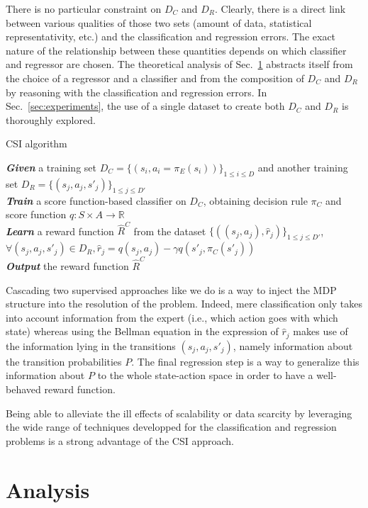 \documentclass{llncs}
\begin{document}
There is no particular constraint on $D_C$ and $D_R$. Clearly, there is a direct link between various qualities of those two sets (amount of data, statistical representativity, etc.) and the classification and regression errors. The exact nature of the relationship between these quantities depends on which classifier and regressor are chosen. The theoretical analysis of Sec.~\ref{sec:analysis} abstracts itself from the choice of a regressor and a classifier and from the composition of $D_C$ and $D_R$ by reasoning with the classification and regression errors. In Sec.~\ref{sec:experiments}, %
the use of a single dataset to create both $D_C$ and $D_R$ is thoroughly explored.
\begin{algorithm}%
  \caption{CSI algorithm}
  \label{algo:cascading}
  \emph{\textbf{Given}} a training set $D_C=\{(s_i,a_i=\pi_E(s_i))\}_{1\leq i \leq D}$ and another training set $D_R=\{(s_{j},a_{j},s'_{j})\}_{1\leq j \leq D'}$\;\\
  \emph{\textbf{Train}} a score function-based classifier on $D_C$, obtaining decision rule $\pi_C$ and score function $q:S\times A \rightarrow \mathbb R$\;\\
  \emph{\textbf{Learn}} a reward function $\hat R^C$ from the dataset $\{((s_{j},a_{j}),\hat{r}_j)\}_{1\leq j \leq D'}$, $\forall (s_j,a_j,s'_j) \in D_R,\hat{r}_j=q(s_{j},a_{j})-\gamma q(s'_{j},\pi_C(s'_{j}))$\;\\
  \emph{\textbf{Output}} the reward function $\hat R^{C}$ \;
\end{algorithm}

Cascading two supervised approaches like we do is a way to inject the MDP structure into the resolution of the problem. Indeed, mere classification only takes into account information from the expert (i.e., which action goes with which state) whereas using the Bellman equation in the expression of $\hat r_j$ makes use of the information lying in the transitions $(s_j,a_j,s'_j)$, namely information about the transition probabilities $P$. The final regression step is a way to generalize this information about $P$ to the whole state-action space in order to have a well-behaved reward function.

Being able to alleviate the ill effects of scalability or data scarcity by leveraging the wide range of techniques developped for the classification and regression problems is a strong advantage of the CSI approach.

\section{Analysis}
\label{sec:analysis}
\end{document}
